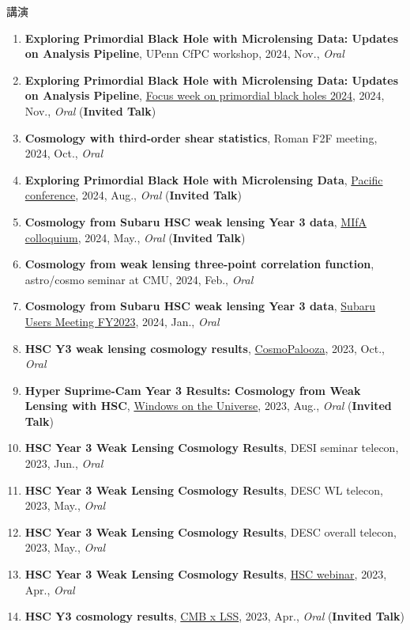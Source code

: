 \begin{rSection}{講演}
\begin{enumerate}[itemsep=0pt, parsep=0pt, topsep=0pt, partopsep=0pt]
\item \textbf{Exploring Primordial Black Hole with Microlensing Data: Updates on Analysis Pipeline}, UPenn CfPC workshop, 2024, Nov., \textit{Oral}
\item \textbf{Exploring Primordial Black Hole with Microlensing Data: Updates on Analysis Pipeline}, \href{https://indico.ipmu.jp/event/439/overview}{Focus week on primordial black holes 2024}, 2024, Nov., \textit{Oral} (\textbf{Invited Talk})
\item \textbf{Cosmology with third-order shear statistics}, Roman F2F meeting, 2024, Oct., \textit{Oral}
\item \textbf{Exploring Primordial Black Hole with Microlensing Data}, \href{https://pacific-conference.pa.ucla.edu/index.html}{Pacific conference}, 2024, Aug., \textit{Oral} (\textbf{Invited Talk})
\item \textbf{Cosmology from Subaru HSC weak lensing Year 3 data}, \href{https://cse.umn.edu/physics/minnesota-institute-astrophysics-mifa-colloquium}{MIfA colloquium}, 2024, May., \textit{Oral} (\textbf{Invited Talk})
\item \textbf{Cosmology from weak lensing three-point correlation function}, astro/cosmo seminar at CMU, 2024, Feb., \textit{Oral}
\item \textbf{Cosmology from Subaru HSC weak lensing Year 3 data}, \href{https://www.subarutelescope.org/Science/SubaruUM/SubaruUM2023/index.html}{Subaru Users Meeting FY2023}, 2024, Jan., \textit{Oral}
\item \textbf{HSC Y3 weak lensing cosmology results}, \href{https://cosmopalooza.lbl.gov/}{CosmoPalooza}, 2023, Oct., \textit{Oral}
\item \textbf{Hyper Suprime-Cam Year 3 Results: Cosmology from Weak Lensing with HSC}, \href{http://vietnam.in2p3.fr/2023/windows/index.html}{Windows on the Universe}, 2023, Aug., \textit{Oral} (\textbf{Invited Talk})
\item \textbf{HSC Year 3 Weak Lensing Cosmology Results}, DESI seminar telecon, 2023, Jun., \textit{Oral}
\item \textbf{HSC Year 3 Weak Lensing Cosmology Results}, DESC WL telecon, 2023, May., \textit{Oral}
\item \textbf{HSC Year 3 Weak Lensing Cosmology Results}, DESC overall telecon, 2023, May., \textit{Oral}
\item \textbf{HSC Year 3 Weak Lensing Cosmology Results}, \href{https://hsc-release.mtk.nao.ac.jp/doc/index.php/wly3/}{HSC webinar}, 2023, Apr., \textit{Oral}
\item \textbf{HSC Y3 cosmology results}, \href{https://www2.yukawa.kyoto-u.ac.jp/~cmb-lss/index.php}{CMB x LSS}, 2023, Apr., \textit{Oral} (\textbf{Invited Talk})

\end{enumerate}
\end{rSection}
